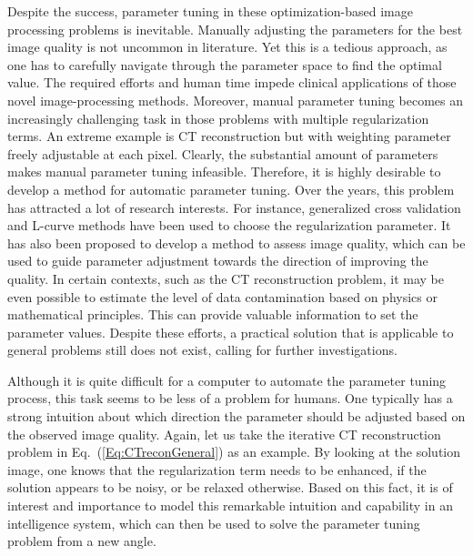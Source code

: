 \documentclass[journal]{IEEEtran}
\begin{document}
Despite the success, parameter tuning in these optimization-based image processing problems is inevitable. Manually adjusting the parameters for the best image quality is not uncommon in literature\cite{Sidky:PMB:2008,Jia:MP:2010,Jia:PMB:2011,Chen:PhyMed:2016,Jia:MP:2012}. Yet this is a tedious approach, as one has to carefully navigate through the parameter space to find the optimal value. The required efforts and human time impede clinical applications of those novel image-processing methods. Moreover, manual parameter tuning becomes an increasingly challenging task in those problems with multiple regularization terms. An extreme example is CT reconstruction but with weighting parameter freely adjustable at each pixel\cite{Guo:SPIE:2010,Tian:PMB:2011}. Clearly, the substantial amount of parameters makes manual parameter tuning infeasible. Therefore, it is highly desirable to develop a method for automatic parameter tuning. Over the years, this problem has attracted a lot of research interests. For instance, generalized cross validation and L-curve methods have been used to choose the regularization parameter\cite{Golub:Techno:1979,Hansen:SIAMreview:1992,Ramani:TIP:2012}. It has also been proposed to develop a method to assess image quality, which can be used to guide parameter adjustment towards the direction of improving the quality\cite{Zhu:TIB:2010, Liang:TIP:2016}. In certain contexts, such as the CT reconstruction problem, it may be even possible to estimate the level of data contamination based on physics or mathematical principles. This can provide valuable information to set the parameter values\cite{Bai:JxST:2017}. Despite these efforts, a practical solution that is  applicable to general problems still does not exist, calling for further investigations. 

Although it is quite difficult for a computer to automate the parameter tuning process, this task seems to be less of a problem for humans. One typically has a strong intuition about which direction the parameter should be adjusted based on the observed image quality. Again, let us take the iterative CT reconstruction problem in Eq.~(\ref{Eq:CTreconGeneral}) as an example. By looking at the solution image, one knows that the regularization term needs to be enhanced, if the solution appears to be noisy, or be relaxed otherwise. Based on this fact, it is of interest and importance to model this remarkable intuition and capability in an intelligence system, which can then be used to solve the parameter tuning problem from a new angle. 
\end{document}
